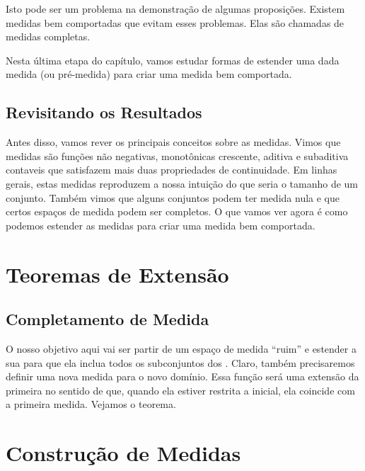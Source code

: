 \almostEverywhere

\subsetsMayNotBeMeasurable

Isto pode ser um problema na demonstração de algumas proposições. Existem medidas bem comportadas que evitam esses problemas. Elas são chamadas de medidas completas.

\completeMeasureSpace

Nesta última etapa do capítulo, vamos estudar formas de estender uma dada medida (ou pré-medida) para criar uma medida bem comportada.

\subsection*{Revisitando os Resultados}
Antes disso, vamos rever os principais conceitos sobre as medidas. Vimos que medidas são funções não negativas, monotônicas crescente, aditiva e subaditiva contaveis que satisfazem mais duas propriedades de continuidade. Em linhas gerais, estas medidas reproduzem a nossa intuição do que seria o tamanho de um conjunto. Também vimos que alguns conjuntos podem ter medida nula e que certos espaços de medida podem ser completos. O que vamos ver agora é como podemos estender as medidas para criar uma medida bem comportada.

\section{Teoremas de Extensão}
\subsection*{Completamento de Medida}
O nosso objetivo aqui vai ser partir de um espaço de medida ``ruim'' e estender a sua \sigmaAlg para que ela inclua todos os subconjuntos dos . Claro, também precisaremos definir uma nova medida para o novo domínio. Essa função será uma extensão da primeira no sentido de que, quando ela estiver restrita a \sigmaAlg inicial, ela coincide com a primeira medida. Vejamos o teorema.

\measureCompletion

\section{Construção de Medidas}